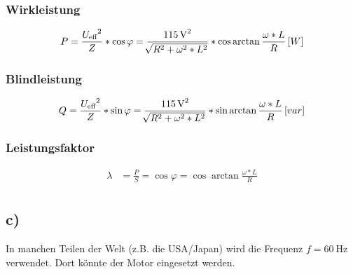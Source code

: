 \documentclass[../../document.tex]{subfiles}
\begin{document}
\subsubsection*{Wirkleistung}

\begin{equation*}
    \begin{split}
        P &= \frac{{U_{\textrm{eff}}}^2}{Z} * \cos{\varphi} = \frac{{\SI{115}{\volt}}^2}{ \sqrt[]{R^2 + \omega^2 * L^2 }} * \cos{\arctan{\frac{\omega * L}{R}}} \left[W\right]\\
    \end{split}
\end{equation*}

\subsubsection*{Blindleistung}

\begin{equation*}
    \begin{split}
        Q &= \frac{{U_{\textrm{eff}}}^2}{Z} * \sin{\varphi} = \frac{{\SI{115}{\volt}}^2}{ \sqrt[]{R^2 + \omega^2 * L^2 }} * \sin{\arctan{\frac{\omega * L}{R}}} \left[var\right]\\
    \end{split}
\end{equation*}

\subsubsection*{Leistungsfaktor}

\begin{equation*}
    \begin{split}
        \lambda &= \frac{P}{S} = \cos{\varphi} = \cos{\arctan{\frac{\omega * L}{R}}}\\
    \end{split}
\end{equation*}

\subsection*{c)}

In manchen Teilen der Welt (z.B. die USA/Japan) wird die Frequenz $f = \SI{60}{\hertz}$ verwendet. Dort könnte der Motor eingesetzt werden.
\end{document}

